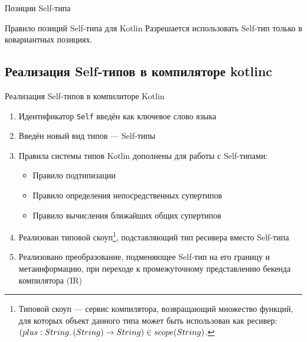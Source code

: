 \documentclass[handout,aspectratio=169,usenames,dvipsnames]{beamer}
\begin{document}
\begin{frame}{Позиции Self-типа}
        \pause

        \begin{block}{Правило позиций Self-типа для Kotlin}
            Разрешается использовать Self-тип только в ковариантных позициях.
        \end{block}
    \end{frame}


    \subsection{Реализация Self-типов в компиляторе kotlinc}

    \begin{frame}{Реализация Self-типов в компилиторе Kotlin}

        \begin{enumerate}
            \item Идентификатор \texttt{Self} введён как ключевое слово языка
            \item Введён новый вид типов --- Self-типы
            \item Правила системы типов Kotlin дополнены для работы с Self-типами:
            \begin{itemize}
                \item Правило подтипизации
                \item Правило определения непосредственных супертипов
                \item Правило вычисления ближайших общих супертипов
            \end{itemize}
            \item Реализован типовой скоуп\footnote{Типовой скоуп --- сервис компилятора, возвращающий множество функций, для которых объект данного типа может быть использован как ресивер: $(plus : String\ldotp(String) \to String) \in scope(String)$.}, подставляющий тип ресивера вместо Self-типа
            \item Реализовано преобразование, подменяющее Self-тип на его границу и метаинформацию, при переходе к промежуточному представлению бекенда компилятора (IR)
        \end{enumerate}
    \end{frame}
\end{document}
